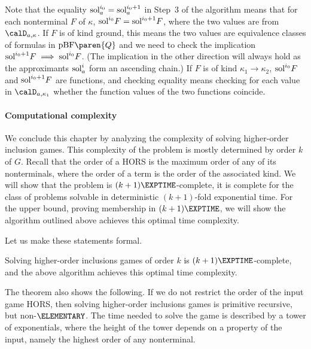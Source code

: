 \documentclass[../../diss.tex]{subfiles}
\begin{document}
Note that the equality $\text{sol}_{a}^{i_0} = \text{sol}_{a}^{i_0 + 1}$ in Step~3 of the algorithm means that for each nonterminal $F$ of $\kappa$, $\text{sol}^{i_0}{F} = \text{sol}^{i_0 + 1}{F}$, where the two values are from $\domaina{\kappa}$.
If $F$ is of kind ground, this means the two values are equivalence classes of formulas in $\pBF\paren{Q}$ and we need to check the implication $\text{sol}^{i_0 + 1}{F} \implies \text{sol}^{i_0}{F}$.
(The implication in the other direction will always hold as the approximants $\text{sol}_{a}^{i}$ form an ascending chain.)
If $F$ is of kind $\kappa_1 \to \kappa_2$, $\text{sol}^{i_0}{F}$ and $\text{sol}^{i_0 + 1}{F}$ are functions, and checking equality means checking for each value in $\domaina{\kappa_1}$ whether the function values of the two functions coincide.

\paragraph{Computational complexity}

We conclude this chapter by analyzing the complexity of solving higher-order inclusion games.
This complexity of the problem is mostly determined by order $k$ of $G$.
Recall that the order of a HORS is the maximum order of any of its nonterminals, where the order of a term is the order of the associated kind.
We will show that the problem is $(k+1)\EXPTIME$-complete, \ie it is complete for the class of problems solvable in deterministic $(k+1)$-fold exponential time.
For the upper bound, \ie proving membership in $(k+1)\EXPTIME$, we will show the algorithm outlined above achieves this optimal time complexity.

Let us make these statements formal.

\begin{problem}
\end{problem}

\begin{theorem}%
\label{Theorem:HorseSolvingComplexity}%
    Solving higher-order inclusions games of order $k$ is $(k+1)\EXPTIME$-complete, and the above algorithm achieves this optimal time complexity.
\end{theorem}

\begin{remark*}
    The theorem also shows the following.
    If we do not restrict the order of the input game HORS, then solving higher-order inclusions games is primitive recursive, but non-$\ELEMENTARY$.
    The time needed to solve the game is described by a tower of exponentials, where the height of the tower depends on a property of the input, namely the highest order of any nonterminal.
\end{remark*}
\end{document}
